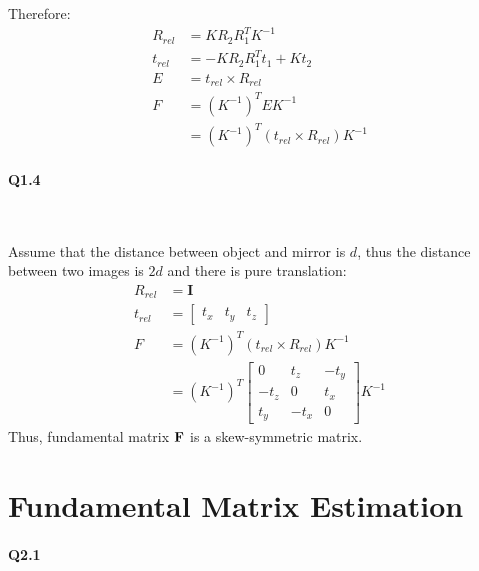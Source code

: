 \documentclass[11pt]{article} \usepackage{fullpage} \usepackage{graphicx} \usepackage{epstopdf} \usepackage{color} \usepackage{psfrag} \usepackage{pdfsync}\usepackage{indentfirst}\usepackage{subfigure}\usepackage{float}\usepackage[section]{placeins}
\begin{document}
Therefore:
\begin{align}
	R_{rel} & = KR_2R_1^TK^{-1} \\
	t_{rel} & = -KR_2R_1^Tt_1 + Kt_2 \\
	E & = t_{rel} \times R_{rel} \\
	F & = \left(K^{-1}\right)^TEK^{-1} \\
	& = \left(K^{-1}\right)^T\left(t_{rel} \times R_{rel}\right)K^{-1}
\end{align}

\paragraph{Q1.4}~{}

Assume that the distance between object and mirror is $d$, thus the distance between two images is $2d$ and there is pure translation:
\begin{align}
	R_{rel} & = \mathbf{I} \\
	t_{rel} & = \begin{bmatrix} t_x & t_y & t_z \end{bmatrix} \\
	F & = \left(K^{-1}\right)^T\left(t_{rel} \times R_{rel}\right)K^{-1} \\
	& = \left(K^{-1}\right)^T \begin{bmatrix} 0 & t_z & -t_y \\ -t_z & 0 & t_x \\ t_y & -t_x & 0 \end{bmatrix}K^{-1}
\end{align} 
Thus, fundamental matrix $\bold{F}$ is a skew-symmetric matrix.

\section{Fundamental Matrix Estimation}

\paragraph{Q2.1}~{}
\end{document}
